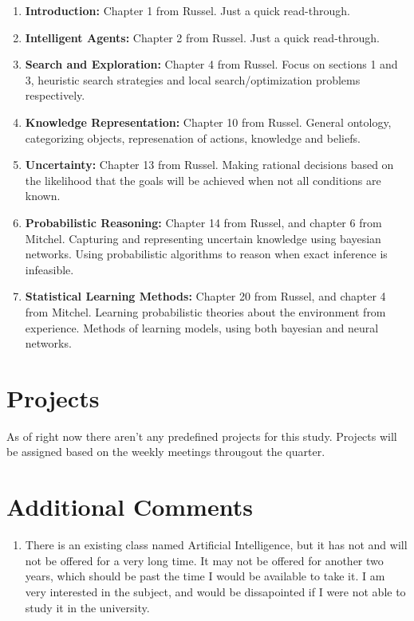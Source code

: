 \documentclass[a4paper,12pt]{article}
\begin{document}
\begin{enumerate}[1)]

  \item {\bf Introduction:} Chapter 1 from Russel. Just a quick read-through.

  \item {\bf Intelligent Agents:} Chapter 2 from Russel. Just a quick read-through.
    
  \item {\bf Search and Exploration:} Chapter 4 from Russel. Focus on
    sections 1 and 3, heuristic search strategies and local
    search/optimization problems respectively.

  \item {\bf Knowledge Representation:} Chapter 10 from
    Russel. General ontology, categorizing objects, represenation of
    actions, knowledge and beliefs.

  \item {\bf Uncertainty:} Chapter 13 from Russel. Making rational
    decisions based on the likelihood that the goals will be achieved
    when not all conditions are known.

  \item {\bf Probabilistic Reasoning:} Chapter 14 from Russel, and
    chapter 6 from Mitchel. Capturing and representing uncertain
    knowledge using bayesian networks. Using probabilistic algorithms
    to reason when exact inference is infeasible.

  \item {\bf Statistical Learning Methods:} Chapter 20 from Russel,
    and chapter 4 from Mitchel. Learning probabilistic theories about
    the environment from experience. Methods of learning models, using
    both bayesian and neural networks.

\end{enumerate}

\section*{Projects}
As of right now there aren't any predefined projects for this
study. Projects will be assigned based on the weekly meetings
througout the quarter.

\section*{Additional Comments}

\begin{enumerate}[]

\item There is an existing class named Artificial Intelligence, but it
  has not and will not be offered for a very long time. It may not be
  offered for another two years, which should be past the time I would
  be available to take it. I am very interested in the subject, and
  would be dissapointed if I were not able to study it in the
  university.
  
\end{enumerate}
\end{document}
